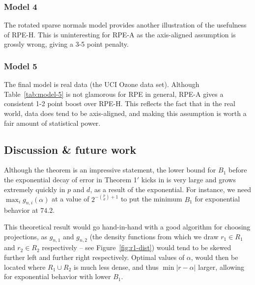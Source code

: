 \documentclass{amsart}
\begin{document}
\subsubsection{Model 4}

The rotated sparse normals model provides another illustration of the usefulness of RPE-H. This is uninteresting for RPE-A as the axis-aligned assumption is
grossly wrong, giving a 3-5 point penalty.

\subsubsection{Model 5}

The final model is real data (the UCI Ozone data set). Although Table~\ref{tab:model-5} is not glamorous for RPE in general, RPE-A gives a consistent 1-2 point
boost over RPE-H. This reflects the fact that in the real world, data does tend to be axis-aligned, and making this assumption is worth a fair amount of
statistical power.




\subsection{Discussion \& future work}

Although the theorem is an impressive statement, the lower bound
for $B_{1}$ before the exponential decay of error in Theorem 1$'$ kicks
in is very large and grows extremely quickly in $p$ and $d$, as
a result of the exponential.
For instance, we need $\max_i g_{n,i}(\alpha)$
at a value of $2^{-\binom{p}{d}+1}$ to put the minimum $B_{1}$ for
exponential behavior at $74.2$.

This theoretical result would go hand-in-hand with a good algorithm for choosing projections, as $g_{n,1}$ and $g_{n,2}$ (the density functions from which we draw $r_{1}\in R_{1}$ and $r_{2}\in R_{2}$ respectively -- see Figure~\ref{fig:r1-dist}) would tend to be skewed further left and further right respectively. Optimal values of $\alpha$, would then be located where $R_{1}\cup R_{2}$ is much less dense, and thus $\min|r-\alpha|$ larger, allowing for exponential behavior with lower $B_{1}$.
\end{document}
